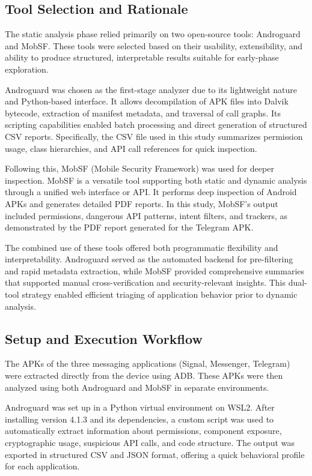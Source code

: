 \documentclass[a4paper,12pt]{report}
\begin{document}
\subsection{Tool Selection and Rationale}

The static analysis phase relied primarily on two open-source tools: Androguard and MobSF. These tools were selected based on their usability, extensibility, and ability to produce structured, interpretable results suitable for early-phase exploration.

Androguard was chosen as the first-stage analyzer due to its lightweight nature and Python-based interface. It allows decompilation of APK files into Dalvik bytecode, extraction of manifest metadata, and traversal of call graphs. Its scripting capabilities enabled batch processing and direct generation of structured CSV reports. Specifically, the CSV file used in this study summarizes permission usage, class hierarchies, and API call references for quick inspection.

Following this, MobSF (Mobile Security Framework) was used for deeper inspection. MobSF is a versatile tool supporting both static and dynamic analysis through a unified web interface or API. It performs deep inspection of Android APKs and generates detailed PDF reports. In this study, MobSF's output included permissions, dangerous API patterns, intent filters, and trackers, as demonstrated by the PDF report generated for the Telegram APK.

The combined use of these tools offered both programmatic flexibility and interpretability. Androguard served as the automated backend for pre-filtering and rapid metadata extraction, while MobSF provided comprehensive summaries that supported manual cross-verification and security-relevant insights. This dual-tool strategy enabled efficient triaging of application behavior prior to dynamic analysis.



\subsection{Setup and Execution Workflow}

The APKs of the three messaging applications (Signal, Messenger, Telegram) were extracted directly from the device using ADB. These APKs were then analyzed using both Androguard and MobSF in separate environments.

Androguard was set up in a Python virtual environment on WSL2. After installing version 4.1.3 and its dependencies, a custom script was used to automatically extract information about permissions, component exposure, cryptographic usage, suspicious API calls, and code structure. The output was exported in structured CSV and JSON format, offering a quick behavioral profile for each application.
\end{document}
